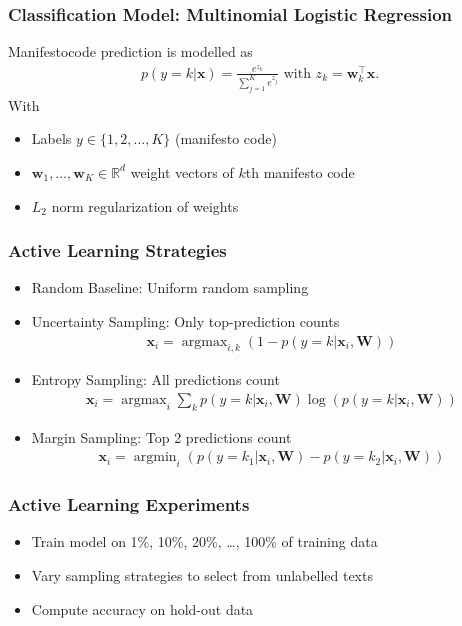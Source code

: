 \documentclass[]{beamer}
\newcommand{\R}{\ensuremath{\mathds{R}}}
\DeclareMathOperator*{\argmax}{argmax}
\DeclareMathOperator*{\argmin}{argmin}
\renewcommand{\vec}[1]{\mathbf{#1}}
\begin{document}
\begin{frame}\frametitle{Classification Model: Multinomial Logistic Regression}
Manifestocode prediction is modelled as
\begin{eqnarray}\label{eq:logreg_multiclass}
p(y=k|\vec{x}) = \frac{e^{z_k}}{\sum_{j=1}^K e^{z_j}}  \textrm{ with }  z_k=\vec{w}_k^{\top}\vec{x}.
\end{eqnarray}
With
\begin{itemize}
\item Labels $y\in\{1,2,\dots,K\}$ (manifesto code)\\ 
\item $\vec{w}_1,\dots,\vec{w}_K\in\R^{d}$ weight vectors of $k$th manifesto code\\ 
\item $L_2$ norm regularization of weights
\end{itemize}
\end{frame}

\begin{frame}\frametitle{Active Learning Strategies}

\begin{itemize}
\item Random Baseline: Uniform random sampling
\item Uncertainty Sampling: Only top-prediction counts
\begin{align}\label{eq:uncertainty_sampling}
\vec{x}_i = \argmax_{i,k} \left(1- p(y=k|\vec{x}_i,\vec{W})\right)
\end{align}
\item Entropy Sampling: All predictions count
\begin{align}\label{eq:entropy_sampling}
\vec{x}_i = \argmax_{i} \sum_k p(y=k|\vec{x}_i,\vec{W}) \log(p(y=k|\vec{x}_i,\vec{W}))
\end{align}
\item Margin Sampling: Top 2 predictions count
\begin{align}\label{eq:entropy_sampling}
\vec{x}_i = \argmin_{i} \left(p(y=k_1|\vec{x}_i,\vec{W}) - p(y=k_2|\vec{x}_i,\vec{W}) \right)
\end{align}
\end{itemize}
\end{frame}

\begin{frame}\frametitle{Active Learning Experiments}

\begin{itemize}
\item Train model on 1\%, 10\%, 20\%, \dots, 100\% of training data
\item Vary sampling strategies to select from unlabelled texts
\item Compute accuracy on hold-out data
\end{itemize}
\end{frame}
\end{document}
